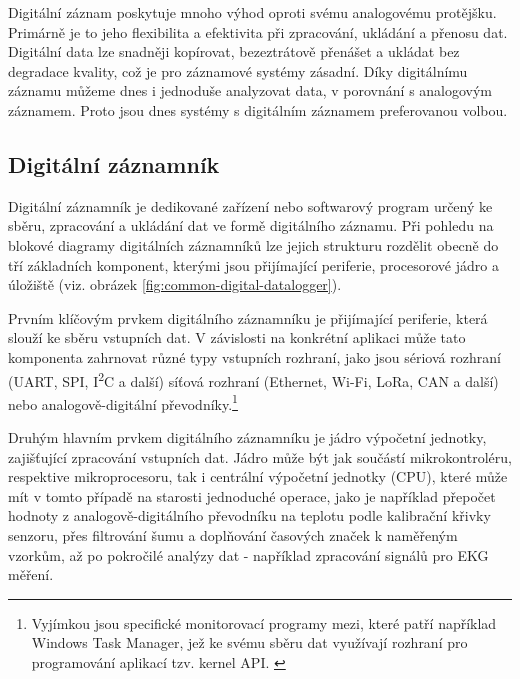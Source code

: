 \newpage

Digitální záznam poskytuje mnoho výhod oproti svému analogovému protějšku. Primárně je to jeho flexibilita a efektivita při zpracování, ukládání a přenosu dat. Digitální data lze snadněji kopírovat, bezeztrátově přenášet a ukládat bez degradace kvality, což je pro záznamové systémy zásadní. Díky digitálnímu záznamu můžeme dnes i jednoduše analyzovat data, v porovnání s analogovým záznamem. Proto jsou dnes systémy s digitálním záznamem preferovanou volbou.

    
\subsection{Digitální záznamník}
\label{digitalni_zaznamik}
Digitální záznamník je dedikované zařízení nebo softwarový program určený ke sběru, zpracování a ukládání dat ve formě digitálního záznamu. Při pohledu na blokové diagramy digitálních záznamníků lze jejich strukturu rozdělit obecně do tří základních komponent, kterými jsou přijímající periferie, procesorové jádro a úložiště (viz. obrázek \ref{fig:common-digital-datalogger}). \cite{researchgate_general_dataloggger_multiple_sdcards, ieee_digital_sound_recorder_arm_sd_card, ieee_multi_connectivity_datalogger_sd_card}

Prvním klíčovým prvkem digitálního záznamníku je přijímající periferie, která slouží ke sběru vstupních dat. V závislosti na konkrétní aplikaci může tato komponenta zahrnovat různé typy vstupních rozhraní, jako jsou sériová rozhraní (UART, SPI, I\textsuperscript{2}C a další) síťová rozhraní (Ethernet, Wi-Fi, LoRa, CAN a další) nebo analogově-digitální převodníky.\footnote{Vyjímkou jsou specifické monitorovací programy mezi, které patří například Windows Task Manager, jež ke svému sběru dat využívají rozhraní pro programování aplikací tzv. kernel API. \cite{fourcore_win_process_birth}} \cite{ieee_digital_sound_recorder_arm_sd_card}


Druhým hlavním prvkem digitálního záznamníku je jádro výpočetní jednotky, zajišťující zpracování vstupních dat. Jádro může být jak součástí mikrokontroléru, respektive mikroprocesoru, tak i centrální výpočetní jednotky (CPU), které může mít v tomto případě na starosti jednoduché operace, jako je například přepočet hodnoty z analogově-digitálního převodníku na teplotu podle kalibrační křivky senzoru, přes filtrování šumu a doplňování časových značek k naměřeným vzorkům, až po pokročilé analýzy dat - například zpracování signálů pro EKG měření. \cite{springer_development_ECG_recorder}

